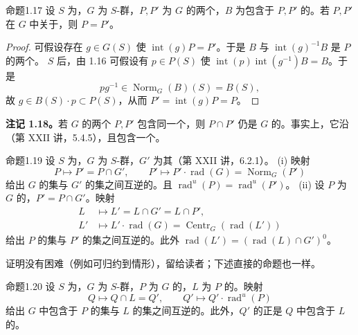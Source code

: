 \begin{SGAresult}{命题}{1.17}
设 $S$ 为，$G$ 为 $S$-群，$P,P'$ 为 $G$ 的两个，$B$ 为包含于 $P,P'$ 的。若 $P,P'$ 在 $G$ 中关于，则 $P=P'$。
\end{SGAresult}
\begin{proof}
可假设存在 $g\in G(S)$ 使 $\operatorname{int}(g)P=P'$。于是 $B$ 与 $\operatorname{int}(g)^{-1}B$ 是 $P$ 的两个。
 $S$ 后，由 1.16 可假设有 $p\in P(S)$ 使 $\operatorname{int}(p)\operatorname{int}(g^{-1})B=B$。于是
\[pg^{-1}\in\operatorname{Norm}_G(B)(S)=B(S),\]
故 $g\in B(S)\cdot p\subset P(S)$，从而 $P'=\operatorname{int}(g)P=P$。
\end{proof}
\textbf{注记 1.18。}若 $G$ 的两个 $P,P'$ 包含同一个，则 $P\cap P'$ 仍是 $G$ 的。事实上，它沿（第 XXII 讲，5.4.5），且包含一个。
\begin{SGAresult}{命题}{1.19}
设 $S$ 为，$G$ 为 $S$-群，$G'$ 为其（第 XXII 讲，6.2.1）。
(i) 映射
\[P\longmapsto P'=P\cap G',\qquad P'\longmapsto P'\cdot\operatorname{rad}(G)=\operatorname{Norm}_G(P')\]
给出 $G$ 的集与 $G'$ 的集之间互逆的。且 $\operatorname{rad}^{u}(P)=\operatorname{rad}^{u}(P')$。
(ii) 设 $P$ 为 $G$ 的，$P'=P\cap G'$。映射
\[\begin{aligned}L&\longmapsto L'=L\cap G'=L\cap P',\\L'&\longmapsto L'\cdot\operatorname{rad}(G)=\operatorname{Centr}_G(\operatorname{rad}(L'))\end{aligned}\]
给出 $P$ 的集与 $P'$ 的集之间互逆的。此外 $\operatorname{rad}(L')=(\operatorname{rad}(L)\cap G')^0$。
\end{SGAresult}
证明没有困难（例如可归约到情形），留给读者；下述直接的命题也一样。
\begin{SGAresult}{命题}{1.20}
设 $S$ 为，$G$ 为 $S$-群，$P$ 为 $G$ 的，$L$ 为 $P$ 的。映射
\[Q\longmapsto Q\cap L=Q',\qquad Q'\longmapsto Q'\cdot\operatorname{rad}^{u}(P)\]
给出 $G$ 中包含于 $P$ 的集与 $L$ 的集之间互逆的。此外，$Q'$ 的正是 $Q$ 中包含于 $L$ 的。
\end{SGAresult}
